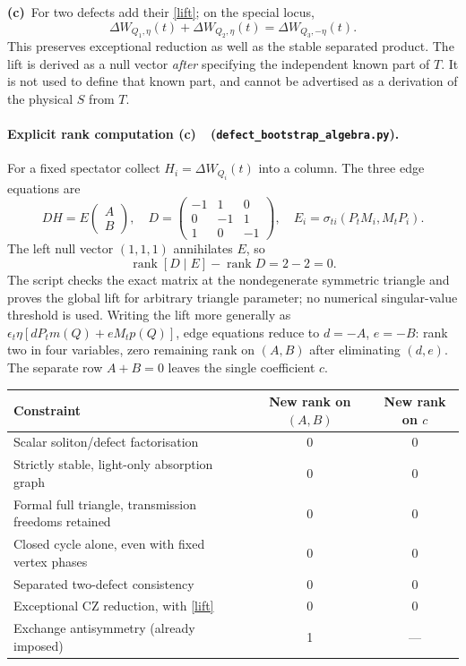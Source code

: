 \documentclass[11pt,a4paper]{article}
\newcommand{\C}{\textbf{(c)}\ }
\newcommand{\file}[1]{\nolinkurl{#1}}
\newcommand{\alg}{\file{defect_bootstrap_algebra.py}}
\begin{document}
\C For two defects add their \eqref{lift}; on the special locus,
\begin{equation}
 \Delta W_{Q_1,\eta}(t)+\Delta W_{Q_2,\eta}(t)=\Delta W_{Q_3,-\eta}(t).
 \label{liftfusion}
\end{equation}
This preserves exceptional reduction as well as the stable separated product.
The lift is derived as a null vector \emph{after} specifying the independent
known part of $T$. It is not used to define that known part, and cannot
be advertised as a derivation of the physical $S$ from $T$.

\paragraph{Explicit rank computation \C\ (\alg).}
For a fixed spectator collect $H_i=\Delta W_{Q_i}(t)$ into a column. The
three edge equations are
\begin{equation}
 DH=E\begin{pmatrix}A\\B\end{pmatrix},\quad
 D=\begin{pmatrix}-1&1&0\\0&-1&1\\1&0&-1\end{pmatrix},\quad
 E_i=\sigma_{ti}(P_tM_i,M_tP_i).\label{rankeq}
\end{equation}
The left null vector $(1,1,1)$ annihilates $E$, so
\begin{equation}
 \boxed{\operatorname{rank}[D\mid E]-\operatorname{rank}D=2-2=0.}\label{rank0}
\end{equation}
The script checks the exact matrix at the nondegenerate symmetric triangle
and proves the global lift for arbitrary triangle parameter; no numerical
singular-value threshold is used. Writing the lift more generally as
$\epsilon_t\eta[dP_tm(Q)+eM_tp(Q)]$, edge equations reduce to $d=-A$,
$e=-B$: rank two in four variables, zero remaining rank on $(A,B)$ after
eliminating $(d,e)$. The separate row $A+B=0$ leaves the single coefficient $c$.

\begin{center}\small
\begin{tabular}{@{}L{8.5cm}cc@{}}\toprule
Constraint & New rank on $(A,B)$ & New rank on $c$\\\midrule
Scalar soliton/defect factorisation & 0 & 0\\
Strictly stable, light-only absorption graph & 0 & 0\\
Formal full triangle, transmission freedoms retained & 0 & 0\\
Closed cycle alone, even with fixed vertex phases & 0 & 0\\
Separated two-defect consistency & 0 & 0\\
Exceptional CZ reduction, with \eqref{lift} & 0 & 0\\
Exchange antisymmetry (already imposed) & 1 & ---\\\bottomrule
\end{tabular}\end{center}
\end{document}
